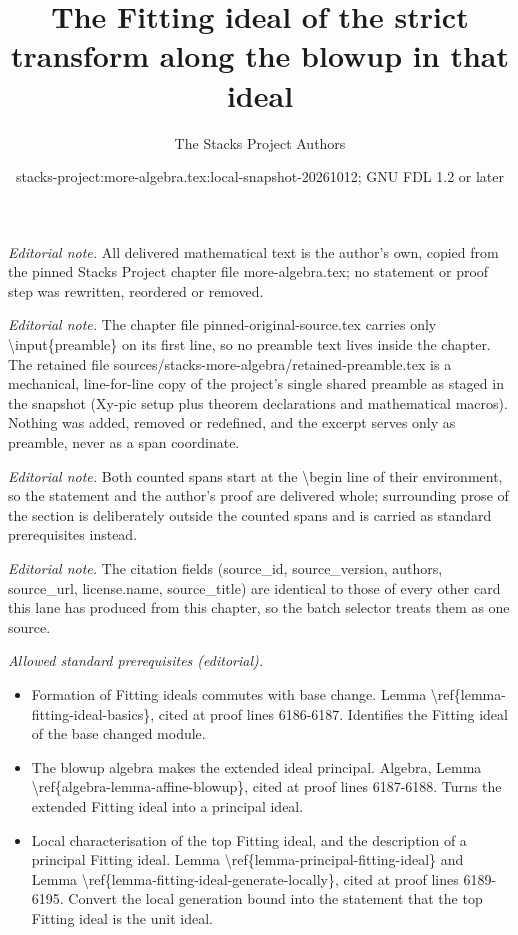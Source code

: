 \documentclass[10pt,a4paper]{amsart}
\title{The Fitting ideal of the strict transform along the blowup in that ideal}
\author{The Stacks Project Authors}
\date{stacks-project:more-algebra.tex:local-snapshot-20261012; GNU FDL 1.2 or later}
\theoremstyle{plain}
\theoremstyle{definition}
\theoremstyle{remark}
\numberwithin{equation}{subsection}
\begin{document}
\maketitle
\setcounter{subsection}{1}
\noindent\textit{Editorial note.} All delivered mathematical text is the author's own, copied from the pinned Stacks Project chapter file more-algebra.tex; no statement or proof step was rewritten, reordered or removed.\par\medskip
\noindent\textit{Editorial note.} The chapter file pinned-original-source.tex carries only \textbackslash{}input\{preamble\} on its first line, so no preamble text lives inside the chapter. The retained file sources/stacks-more-algebra/retained-preamble.tex is a mechanical, line-for-line copy of the project's single shared preamble as staged in the snapshot (Xy-pic setup plus theorem declarations and mathematical macros). Nothing was added, removed or redefined, and the excerpt serves only as preamble, never as a span coordinate.\par\medskip
\noindent\textit{Editorial note.} Both counted spans start at the \textbackslash{}begin line of their environment, so the statement and the author's proof are delivered whole; surrounding prose of the section is deliberately outside the counted spans and is carried as standard prerequisites instead.\par\medskip
\noindent\textit{Editorial note.} The citation fields (source\_id, source\_version, authors, source\_url, license.name, source\_title) are identical to those of every other card this lane has produced from this chapter, so the batch selector treats them as one source.\par\medskip
\noindent\textit{Allowed standard prerequisites (editorial).}\begin{itemize}
\item Formation of Fitting ideals commutes with base change. Lemma \textbackslash{}ref\{lemma-fitting-ideal-basics\}, cited at proof lines 6186-6187. Identifies the Fitting ideal of the base changed module.
\item The blowup algebra makes the extended ideal principal. Algebra, Lemma \textbackslash{}ref\{algebra-lemma-affine-blowup\}, cited at proof lines 6187-6188. Turns the extended Fitting ideal into a principal ideal.
\item Local characterisation of the top Fitting ideal, and the description of a principal Fitting ideal. Lemma \textbackslash{}ref\{lemma-principal-fitting-ideal\} and Lemma \textbackslash{}ref\{lemma-fitting-ideal-generate-locally\}, cited at proof lines 6189-6195. Convert the local generation bound into the statement that the top Fitting ideal is the unit ideal.
\end{itemize}\medskip
\end{document}
